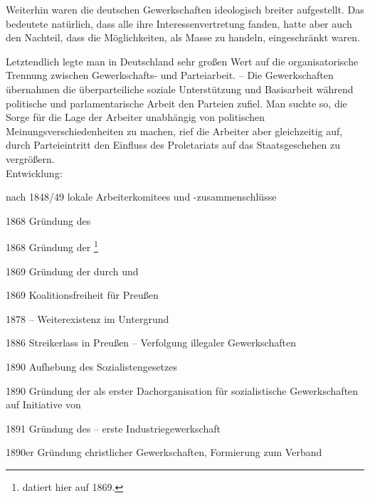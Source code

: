 Weiterhin waren die deutschen Gewerkschaften ideologisch breiter
aufgestellt. Das bedeutete natürlich, dass alle ihre
Interessenvertretung fanden, hatte aber auch den Nachteil, dass die
Möglichkeiten, als Masse zu handeln, eingeschränkt waren.

Letztendlich legte man in Deutschland sehr großen Wert auf die
organisatorische Trennung zwischen Gewerkschafts- und Parteiarbeit.
-- Die Gewerkschaften übernahmen die überparteiliche soziale
Unterstützung und Basisarbeit während politische und parlamentarische
Arbeit den Parteien zufiel. Man suchte so, die Sorge für die Lage der
Arbeiter unabhängig von politischen Meinungsverschiedenheiten zu
machen, rief die Arbeiter aber gleichzeitig auf, durch Parteieintritt
den Einfluss des Proletariats auf das Staatsgeschehen zu
vergrößern. \\

\noindent Entwicklung:

\begin{chronik}
\item[nach 1848/49] lokale Arbeiterkomitees und -zusammenschlüsse

\item[1868] Gründung des 

\item[1868] Gründung der \footnote{\cite{LEMOHiDu} datiert
hier auf 1869.}

\item[1869] Gründung der 
durch  und 

\item[1869] Koalitionsfreiheit für Preußen

\item[1878]  -- Weiterexistenz im Untergrund

\item[1886] Streikerlass in Preußen -- Verfolgung illegaler
Gewerkschaften

\item[1890] Aufhebung des Sozialistengesetzes

\item[1890] Gründung der  als erster Dachorganisation für
sozialistische Gewerkschaften auf Initiative von 

\item[1891] Gründung des  -- erste
Industriegewerkschaft

\item[1890er] Gründung christlicher Gewerkschaften, Formierung zum
Verband 
\end{chronik}

